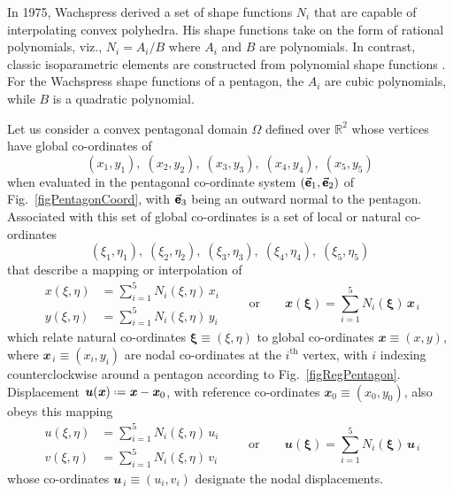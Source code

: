 In 1975, Wachspress \cite{Wachspress75,Wachspress16} derived a set of shape functions $N_i$ that are capable of interpolating convex polyhedra.  His shape functions take on the form of rational polynomials, viz., $N_i = A_i / B$ where $A_i$ and $B$ are polynomials.  In contrast, classic isoparametric elements are constructed from polynomial shape functions \cite{Hughes87}.  For the Wachspress shape functions of a pentagon, the $A_i$ are cubic polynomials, while $B$ is a quadratic polynomial.

Let us consider a convex pentagonal domain $\Omega$ defined over $\mathbb{R}^2$ whose vertices have global co-ordinates of
\begin{displaymath}
(x_1, y_1) , \; (x_2, y_2) , \; (x_3, y_3) , \; (x_4, y_4), \; (x_5, y_5)
\end{displaymath}
when evaluated in the pentagonal co-ordinate system $( \vec{\boldsymbol{\mathsf{e}}}_1 , \vec{\boldsymbol{\mathsf{e}}}_2 )$ of Fig.~\ref{figPentagonCoord}, with $\vec{\boldsymbol{\mathsf{e}}}_3$ being an outward normal to the pentagon.  Associated with this set of global co-ordinates is a set of local or natural co-ordinates
\begin{displaymath}
(\xi_1 , \eta_1) , \; (\xi_2 , \eta_2) , \; (\xi_3 , \eta_3) , \; (\xi_4 , \eta_4) , \; (\xi_5 , \eta_5)
\end{displaymath}
that describe a mapping or interpolation of
\begin{equation}
\begin{aligned}
x(\xi, \eta) & = \sum\nolimits_{i=1}^5 N_i (\xi, \eta) \, x_i \\
y(\xi, \eta) & = \sum\nolimits_{i=1}^5 N_i (\xi, \eta) \, y_i
\end{aligned} 
\qquad \text{or} \qquad
\mathbfit{x}(\boldsymbol{\xi}) = \sum_{i=1}^5 N_i (\boldsymbol{\xi}) \, 
\mathbfit{x}_{\,i}
\end{equation}
which relate natural co-ordinates $\boldsymbol{\xi} \equiv (\xi, \eta)$ to global co-ordinates $\mathbfit{x} \equiv (x, y)$, where $\mathbfit{x}_{\,i} \equiv (x_i, y_i)$ are nodal co-ordinates at the $i^{\mathrm{th}}$ vertex, with $i$ indexing counter\-clockwise around a pentagon according to Fig.~\ref{figRegPentagon}.  Displacement $\mathbfit{u} (\mathbfit{x}) \defeq \mathbfit{x} - \mathbfit{x}_0$, with reference co-ordinates $\mathbfit{x}_0 \equiv (x_0, y_0)$, also obeys this mapping
\begin{equation}
\begin{aligned}
u(\xi, \eta) & = \sum\nolimits_{i=1}^5 N_i (\xi, \eta) \, u_i \\
v(\xi, \eta) & = \sum\nolimits_{i=1}^5 N_i (\xi, \eta) \, v_i
\end{aligned} 
\qquad \text{or} \qquad
\mathbfit{u}(\boldsymbol{\xi}) = \sum_{i=1}^5 N_i (\boldsymbol{\xi}) \, 
\mathbfit{u}_{\,i}
\end{equation}
whose co-ordinates $\mathbfit{u}_{\,i} \equiv (u_i , v_i)$ designate the nodal displacements.

